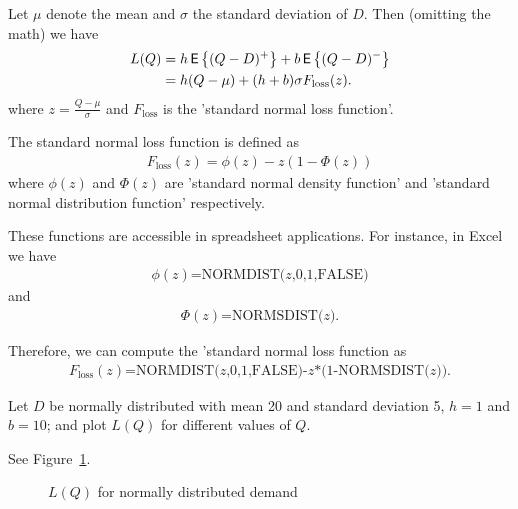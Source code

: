 \begin{solution}
Let $\mu$ denote the mean and $\sigma$ the standard deviation of $D$. Then (omitting the math) we have
\begin{align*}
L(Q) 
& = h \,\mathsf{E}\left\{(Q-D)^+\right\} + b \,\mathsf{E}\left\{(Q-D)^-\right\} \\
& = h(Q-\mu) + (h+b) \sigma F_{\text{loss}}(z).
\end{align*}
where $z=\frac{Q-\mu}{\sigma}$ and $F_{\text{loss}}$ is the 'standard normal loss function'. 

The standard normal loss function is defined as 
\begin{align*}
F_{\text{loss}}(z) = \phi(z)-z(1-\Phi(z))
\end{align*}
where $\phi(z)$ and $\Phi(z)$ are 'standard normal density function' and 'standard normal distribution function' respectively. 

These functions are accessible in spreadsheet applications. For instance, in Excel we have 
\begin{align*}
\phi(z) \text{=NORMDIST($z$,0,1,FALSE)}
\end{align*}
and
\begin{align*}
\Phi(z) \text{=NORMSDIST($z$)}.
\end{align*}

Therefore, we can compute the 'standard normal loss function as
\begin{align*}
F_{\text{loss}}(z) \text{=NORMDIST($z$,0,1,FALSE)-$z$*(1-NORMSDIST($z$))}.
\end{align*}
\end{solution}

\begin{question}\label{ex:nw_stoc}
Let $D$ be normally distributed with mean 20 and standard deviation 5, $h=1$ and $b=10$; and plot $L(Q)$ for different values of $Q$. 
\end{question}

\begin{solution}
See Figure~\ref{fig:LQ_normal}.

\begin{figure}[htbp]
\centering
{}
\caption{$L(Q)$ for normally distributed demand}
\label{fig:LQ_normal}
\end{figure}
\end{solution}


